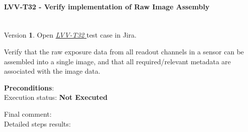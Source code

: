 \documentclass[DM,lsstdraft,STR,toc]{lsstdoc}
\begin{document}
\paragraph{ LVV-T32 - Verify implementation of Raw Image Assembly }\mbox{}\\

Version \textbf{1}.
Open  \href{https://jira.lsstcorp.org/secure/Tests.jspa#/testCase/LVV-T32}{\textit{ LVV-T32 } }
test case in Jira.

Verify that the raw exposure data from all readout channels in a sensor
can be assembled into a single image, and that all required/relevant
metadata are associated with the image data.~

\textbf{ Preconditions}:\\


Execution status: {\bf Not Executed }

Final comment:\\


Detailed steps results:
\end{document}
